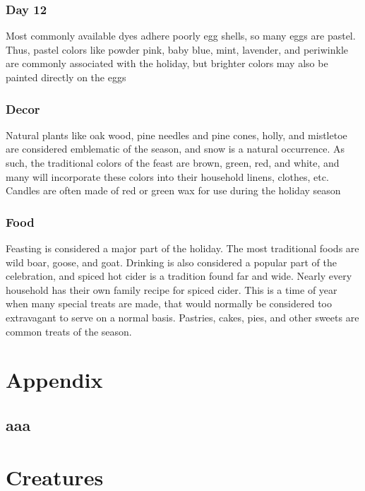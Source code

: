 \documentclass[10pt,a4paper,twoside,twocolumn,openany,bg=print,nodeprecatedcode]{dndbook}
\begin{document}
\subsection{Day 12}
Most commonly available dyes adhere poorly egg shells, so many eggs are pastel. Thus, pastel colors like powder pink, baby blue, mint, lavender, and periwinkle are commonly associated with the holiday, but brighter colors may also be painted directly on the eggs
\subsection{Decor}
Natural plants like oak wood, pine needles and pine cones, holly, and mistletoe are considered emblematic of the season, and snow is a natural occurrence. As such, the traditional colors of the feast are brown, green, red, and white, and many will incorporate these colors into their household linens, clothes, etc. Candles are often made of red or green wax for use during the holiday season
\subsection{Food}
Feasting is considered a major part of the holiday. The most traditional foods are wild boar, goose, and goat. Drinking is also considered a popular part of the celebration, and spiced hot cider is a tradition found far and wide. Nearly every household has their own family recipe for spiced cider. This is a time of year when many special treats are made, that would normally be considered too extravagant to serve on a normal basis. Pastries, cakes, pies, and other sweets are common treats of the season.
\appendix
\chapter{Appendix}

\section{aaa}

\chapter{Creatures}
\end{document}
